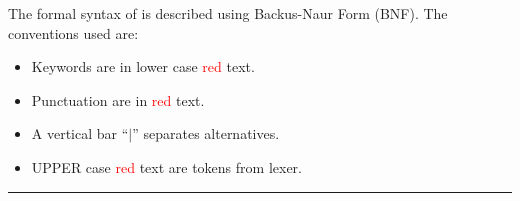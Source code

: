 The formal syntax of \mhdl{} is described using Backus-Naur Form (BNF). 
The conventions used are:
\begin{itemize}
\item Keywords are in lower case \textcolor{red}{red} text.
\item Punctuation are in \textcolor{red}{red} text.
\item A vertical bar ``$|$'' separates alternatives. 
\item UPPER case \textcolor{red}{red} text are tokens from lexer.
\end{itemize}
\rule{130mm}{1pt}\\[1cm]


\begin{small}
  
\end{small}

